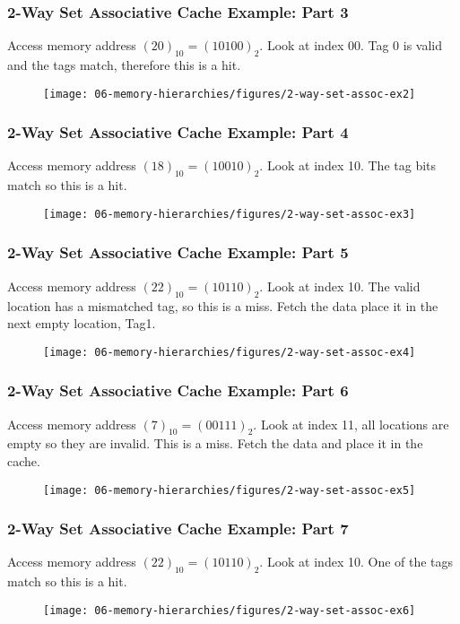 {%
\begin{frame}\frametitle{2-Way Set Associative Cache Example: Part 3}
Access memory address $(20)_{10}=(10100)_2$. Look at index 00. Tag 0 is valid and the tags match, therefore this is a hit.
\begin{figure}[H]
\centering
	{\texttt{[image: 06-memory-hierarchies/figures/2-way-set-assoc-ex2]}}
\end{figure}
\end{frame}

\begin{frame}\frametitle{2-Way Set Associative Cache Example: Part 4}
Access memory address $(18)_{10}=(10010)_2$. Look at index 10. The tag bits match so this is a hit.
\begin{figure}[H]
\centering
	{\texttt{[image: 06-memory-hierarchies/figures/2-way-set-assoc-ex3]}}
\end{figure}
\end{frame}
\begin{frame}\frametitle{2-Way Set Associative Cache Example: Part 5}
Access memory address $(22)_{10}= (10110)_2$. Look at index 10. The valid location has a mismatched tag, so this is a miss. Fetch the data place it in the next empty location, Tag1.
\begin{figure}[H]
\centering
	{\texttt{[image: 06-memory-hierarchies/figures/2-way-set-assoc-ex4]}}
\end{figure}

\end{frame}

\begin{frame}\frametitle{2-Way Set Associative Cache Example: Part 6}
Access memory address $(7)_{10}=(00111)_2$. Look at index 11, all locations are empty so they are invalid. This is a miss. Fetch the data and place it in the cache.
\begin{figure}[H]
\centering
	{\texttt{[image: 06-memory-hierarchies/figures/2-way-set-assoc-ex5]}}
\end{figure}
\end{frame}

\begin{frame}\frametitle{2-Way Set Associative Cache Example: Part 7}
Access memory address $(22)_{10}=(10110)_2$. Look at index 10. One of the tags match so this is a hit.
\begin{figure}[H]
\centering
	{\texttt{[image: 06-memory-hierarchies/figures/2-way-set-assoc-ex6]}}
\end{figure}
\end{frame}

}
